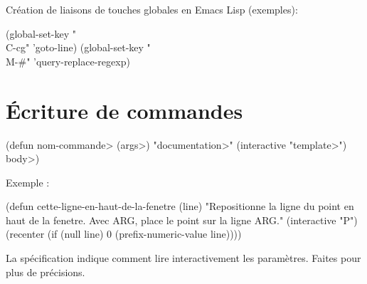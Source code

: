 Cr\'eation de liaisons de touches globales en Emacs Lisp (exemples):

\beginexample%
(global-set-key "\\C-cg" 'goto-line)
(global-set-key "\\M-\#" 'query-replace-regexp)
\endexample

\section{\'Ecriture de commandes}

\beginexample%
(defun \<nom-commande> (\<args>)
  "\<documentation>" (interactive "\<template>")
  \<body>)
\endexample

Exemple :

\beginexample%
(defun cette-ligne-en-haut-de-la-fenetre (line)
"Repositionne la ligne du point en haut de la fenetre.
Avec ARG, place le point sur la ligne ARG."
  (interactive "P")
  (recenter (if (null line)
                0
              (prefix-numeric-value line))))
\endexample

La sp\'ecification  indique comment lire
interactivement les param\`etres. Faites  pour
plus de pr\'ecisions.

\copyrightnotice

\bye


